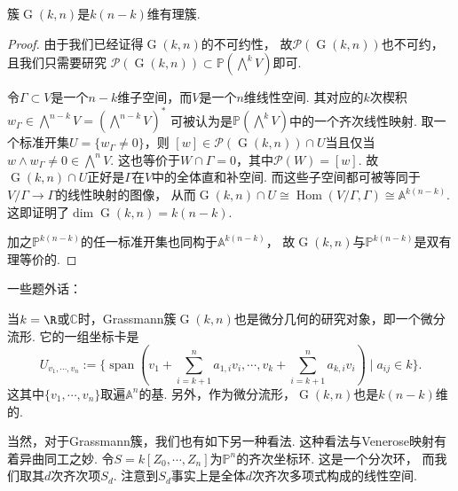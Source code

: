     \begin{proposition}
        簇$\operatorname{G}(k,n)$是$k(n-k)$维有理簇.
    \end{proposition}
    \begin{proof}
        由于我们已经证得$\operatorname{G}(k,n)$的不可约性，
        故$\mathcal{P}(\operatorname{G}(k,n))$也不可约，且我们只需要研究
        $\mathcal{P}(\operatorname{G}(k,n)) \subset \mathbb{P}(\bigwedge\nolimits^{k}V)$即可.

        令$\Gamma \subset V$是一个$n-k$维子空间，而$V$是一个$n$维线性空间. 其对应的$k$次楔积
        $w_{\Gamma} \in \bigwedge\nolimits^{n-k}V = (\bigwedge\nolimits^{n-k}V)^{*}$
        可被认为是$\mathbb{P}(\bigwedge\nolimits^{k}V)$中的一个齐次线性映射. 
        取一个标准开集$U = \{w_{\Gamma} \neq 0\}$，则
        $[w] \in \mathcal{P}(\operatorname{G}(k,n)) \cap U$当且仅当
        $w \wedge w_{\Gamma} \neq 0 \in \bigwedge\nolimits^{n}V$. 
        这也等价于$W \cap \Gamma = 0$，其中$\mathcal{P}(W)=[w]$. 
        故$\operatorname{G}(k,n) \cap U$正好是$\Gamma$在$V$中的全体直和补空间.
        而这些子空间都可被等同于$V/\Gamma \rightarrow \Gamma$的线性映射的图像，
        从而$\operatorname{G}(k,n) \cap U \cong \operatorname{Hom}(V/\Gamma,\Gamma)\cong \mathbb{A}^{k(n-k)}$.
        这即证明了$\dim \operatorname{G}(k,n) = k(n-k)$.

        加之$\mathbb{P}^{k(n-k)}$的任一标准开集也同构于$\mathbb{A}^{k(n-k)}$，
        故$\operatorname{G}(k,n)$与$\mathbb{P}^{k(n-k)}$是双有理等价的.
    \end{proof}

    \begin{remark}
        一些题外话：
        
        当$k=\R$或$\mathbb{C}$时，Grassmann簇$\operatorname{G}(k,n)$也是微分几何的研究对象，即一个微分流形. 它的一组坐标卡是
        \[U_{v_{1},\cdots,v_{n}}:=
        \{\operatorname{span}(v_{1}+\sum_{i=k+1}^{n}a_{1,i}v_{i},\cdots,v_{k}+\sum_{i=k+1}^{n}a_{k,i}v_{i}) \mid a_{ij} \in k\}.\]
        这其中$\{v_{1},\cdots,v_{n}\}$取遍$\mathbb{A}^{n}$的基. 
        另外，作为微分流形，$\operatorname{G}(k,n)$也是$k(n-k)$维的.

    \end{remark}

    当然，对于Grassmann簇，我们也有如下另一种看法. 这种看法与Venerose映射有着异曲同工之妙.
    令$S = k[Z_{0},\cdots,Z_{n}]$为$\mathbb{P}^{n}$的齐次坐标环. 这是一个分次环，
    而我们取其$d$次齐次项$S_{d}$. 注意到$S_{d}$事实上是全体$d$次齐次多项式构成的线性空间.


